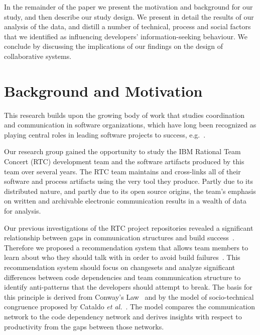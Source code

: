 \documentclass{sig-alternate}
\begin{document}
In the remainder of the paper we present the motivation and background for our study, and then describe our study design.  We present in detail the results of our analysis of the data, and distill a number of technical, process and social factors that we identified as influencing developers' information-seeking behaviour. We conclude by discussing the implications of our findings on the design of collaborative systems. 


\section{Background and Motivation}
\label{sec:rq}

This research builds upon the growing body of work that studies coordination and communication in software organizations, which have long been recognized as playing central roles in leading software projects to success, e.g.~\cite{kraut:cacm:1995,curtis:acm:1988}.  

Our research group gained the opportunity to study the IBM Rational Team Concert (RTC) development team and the software artifacts produced by this team over several years. The RTC team maintains and cross-links all of their software and process artifacts using the very tool they produce. Partly due to its distributed nature, and partly due to its open source origins, the team's emphasis on written and archivable electronic communication results in a wealth of data for analysis.

Our previous investigations of the RTC project repositories revealed a significant relationship between gaps in communication structures and build success~\cite{wolf:icse:2009}. Therefore we proposed a recommendation system that allows team members to learn about who they should talk with in order to avoid build failures~\cite{schroeter:rsse:2008}. This recommendation system should focus on changesets and analyze significant differences between code dependencies and team communication structure to identify anti-patterns that the developers should attempt to break.
The basis for this principle is derived from Conway's Law~\cite{conway:datamination:1968} and by the model of socio-technical congruence proposed by Cataldo \emph{et al.}~\cite{cataldo:cscw:2006,cataldo:esem:2008}.
The model compares the communication network to the code dependency network and derives insights with respect to productivity from the gaps between those networks.
\end{document}
